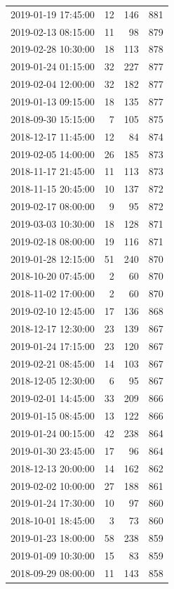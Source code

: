 \begin{tabular}{lrrr}
2019-01-19 17:45:00 & 12 & 146 & 881 \\
2019-02-13 08:15:00 & 11 & 98 & 879 \\
2019-02-28 10:30:00 & 18 & 113 & 878 \\
2019-01-24 01:15:00 & 32 & 227 & 877 \\
2019-02-04 12:00:00 & 32 & 182 & 877 \\
2019-01-13 09:15:00 & 18 & 135 & 877 \\
2018-09-30 15:15:00 & 7 & 105 & 875 \\
2018-12-17 11:45:00 & 12 & 84 & 874 \\
2019-02-05 14:00:00 & 26 & 185 & 873 \\
2018-11-17 21:45:00 & 11 & 113 & 873 \\
2018-11-15 20:45:00 & 10 & 137 & 872 \\
2019-02-17 08:00:00 & 9 & 95 & 872 \\
2019-03-03 10:30:00 & 18 & 128 & 871 \\
2019-02-18 08:00:00 & 19 & 116 & 871 \\
2019-01-28 12:15:00 & 51 & 240 & 870 \\
2018-10-20 07:45:00 & 2 & 60 & 870 \\
2018-11-02 17:00:00 & 2 & 60 & 870 \\
2019-02-10 12:45:00 & 17 & 136 & 868 \\
2018-12-17 12:30:00 & 23 & 139 & 867 \\
2019-01-24 17:15:00 & 23 & 120 & 867 \\
2019-02-21 08:45:00 & 14 & 103 & 867 \\
2018-12-05 12:30:00 & 6 & 95 & 867 \\
2019-02-01 14:45:00 & 33 & 209 & 866 \\
2019-01-15 08:45:00 & 13 & 122 & 866 \\
2019-01-24 00:15:00 & 42 & 238 & 864 \\
2019-01-30 23:45:00 & 17 & 96 & 864 \\
2018-12-13 20:00:00 & 14 & 162 & 862 \\
2019-02-02 10:00:00 & 27 & 188 & 861 \\
2019-01-24 17:30:00 & 10 & 97 & 860 \\
2018-10-01 18:45:00 & 3 & 73 & 860 \\
2019-01-23 18:00:00 & 58 & 238 & 859 \\
2019-01-09 10:30:00 & 15 & 83 & 859 \\
2018-09-29 08:00:00 & 11 & 143 & 858 \\

\end{tabular}
